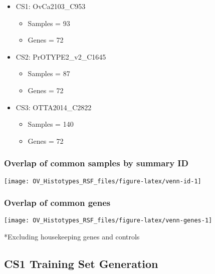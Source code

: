 \documentclass[
]{report}
\providecommand{\tightlist}{%
  \setlength{\itemsep}{0pt}\setlength{\parskip}{0pt}}
\begin{document}
\begin{itemize}
\tightlist
\item
  CS1: OvCa2103\_C953

  \begin{itemize}
  \tightlist
  \item
    Samples = 93
  \item
    Genes = 72
  \end{itemize}
\item
  CS2: PrOTYPE2\_v2\_C1645

  \begin{itemize}
  \tightlist
  \item
    Samples = 87
  \item
    Genes = 72
  \end{itemize}
\item
  CS3: OTTA2014\_C2822

  \begin{itemize}
  \tightlist
  \item
    Samples = 140
  \item
    Genes = 72
  \end{itemize}
\end{itemize}

\hypertarget{overlap-of-common-samples-by-summary-id}{%
\subsubsection{Overlap of common samples by summary ID}\label{overlap-of-common-samples-by-summary-id}}

\begin{center}\texttt{[image: OV\_Histotypes\_RSF\_files/figure-latex/venn-id-1]} \end{center}

\hypertarget{overlap-of-common-genes}{%
\subsubsection{Overlap of common genes}\label{overlap-of-common-genes}}

\begin{center}\texttt{[image: OV\_Histotypes\_RSF\_files/figure-latex/venn-genes-1]} \end{center}

*Excluding housekeeping genes and controls

\hypertarget{cs1-training-set-generation}{%
\subsection{CS1 Training Set Generation}\label{cs1-training-set-generation}}
\end{document}
